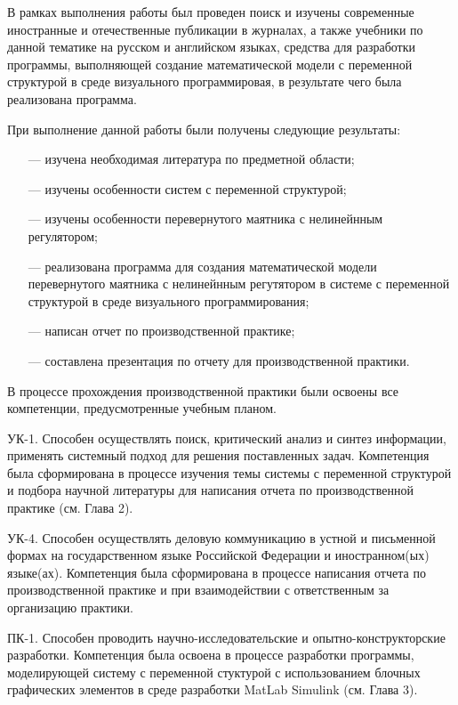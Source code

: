 \conclusion
В рамках выполнения работы был проведен поиск и изучены современные иностранные и отечественные публикации в  журналах, а также учебники по данной тематике на русском и английском языках, средства для разработки программы, выполняющей создание математической модели с переменной структурой в среде визуального программировая, в результате чего была реализована программа.

При выполнение данной работы были получены следующие результаты:
\begin{enumerate}
\item[—] изучена необходимая литература по предметной области;
\item[—] изучены особенности систем с переменной структурой;
\item[—] изучены особенности перевернутого маятника с нелинейнным регулятором;
\item[—] реализована программа для создания математической модели перевернутого маятника с нелинейнным регутятором в системе с переменной структурой в среде визуального программирования;
\item[—] написан отчет по производственной практике;
\item[—] составлена презентация по отчету для производственной практики.
\end{enumerate}

В процессе прохождения производственной практики были освоены все компетенции, предусмотренные учебным планом.

УК-1. Способен осуществлять поиск, критический анализ и синтез информации, применять системный подход для решения поставленных задач. Компетенция была сформирована в процессе изучения темы системы с переменной структурой и подбора научной литературы для написания отчета по производственной практике (см. Глава 2).

УК-4. Способен осуществлять деловую коммуникацию в
устной и письменной формах на государственном языке Российской Федерации и иностранном(ых) языке(ах). Компетенция была сформирована в процессе написания отчета по производственной практике и при взаимодействии с ответственным за организацию практики.

ПК-1. Способен проводить научно-исследовательские и
опытно-конструкторские разработки. Компетенция была освоена в процессе разработки программы, моделирующей систему с переменной стуктурой с использованием блочных графических элементов в среде разработки MatLab Simulink (см. Глава 3).

